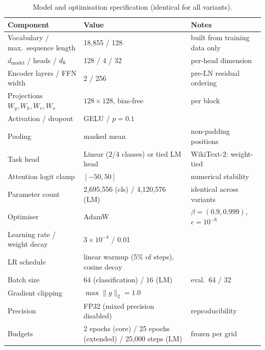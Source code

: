 \begin{table}[t]
  \centering
  \caption{Model and optimisation specification (identical for all variants).}
  \label{tab:model}
  \small
  \begin{tabular*}{\textwidth}{@{\extracolsep{\fill}} l l l}
    \toprule
    \textbf{Component} & \textbf{Value} & \textbf{Notes} \\
    \midrule
    Vocabulary / max.\ sequence length & 18{,}855 / 128 & built from training data only \\
    $d_{\text{model}}$ / heads / $d_k$ & 128 / 4 / 32 & per-head dimension \\
    Encoder layers / FFN width & 2 / 256 & pre-LN residual ordering \\
    Projections $W_q, W_k, W_v, W_o$ & $128 \times 128$, bias-free & per block \\
    Activation / dropout & GELU / $p = 0.1$ & \cite{hendrycks2016,srivastava2014} \\
    Pooling & masked mean & non-padding positions \\
    Task head & Linear (2/4 classes) or tied LM head & WikiText-2: weight-tied \\
    Attention logit clamp & $[-50, 50]$ & numerical stability \\
    Parameter count & 2{,}695{,}556 (cls) / 4{,}120{,}576 (LM) & identical across variants \\
    \midrule
    Optimiser & AdamW \cite{loshchilov2019} & $\beta = (0.9, 0.999)$, $\epsilon = 10^{-8}$ \\
    Learning rate / weight decay & $3 \times 10^{-4}$ / 0.01 & \cite{kingma2015} \\
    LR schedule & linear warmup (5\% of steps), cosine decay & \\
    Batch size & 64 (classification) / 16 (LM) & eval.\ 64 / 32 \\
    Gradient clipping & $\max\|g\|_2 = 1.0$ & \\
    Precision & FP32 (mixed precision disabled) & reproducibility \\
    Budgets & 2 epochs (core) / 25 epochs (extended) / 25{,}000 steps (LM) & frozen per grid \\
    \bottomrule
  \end{tabular*}
\end{table}

